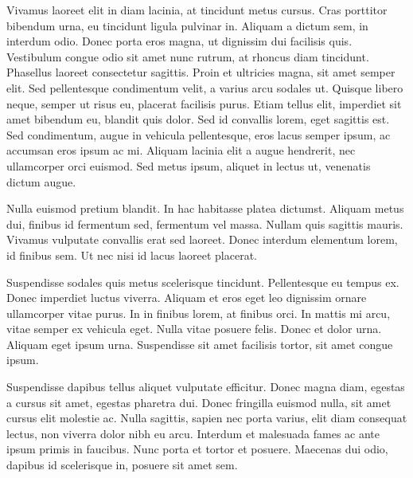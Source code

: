 \documentclass[referee]{jfm}
\begin{document}
Vivamus laoreet elit in diam lacinia, at tincidunt metus cursus. Cras porttitor bibendum urna, eu tincidunt ligula pulvinar in. Aliquam a dictum sem, in interdum odio. Donec porta eros magna, ut dignissim dui facilisis quis. Vestibulum congue odio sit amet nunc rutrum, at rhoncus diam tincidunt. Phasellus laoreet consectetur sagittis. Proin et ultricies magna, sit amet semper elit. Sed pellentesque condimentum velit, a varius arcu sodales ut. Quisque libero neque, semper ut risus eu, placerat facilisis purus. Etiam tellus elit, imperdiet sit amet bibendum eu, blandit quis dolor. Sed id convallis lorem, eget sagittis est. Sed condimentum, augue in vehicula pellentesque, eros lacus semper ipsum, ac accumsan eros ipsum ac mi. Aliquam lacinia elit a augue hendrerit, nec ullamcorper orci euismod. Sed metus ipsum, aliquet in lectus ut, venenatis dictum augue.

Nulla euismod pretium blandit. In hac habitasse platea dictumst. Aliquam metus dui, finibus id fermentum sed, fermentum vel massa. Nullam quis sagittis mauris. Vivamus vulputate convallis erat sed laoreet. Donec interdum elementum lorem, id finibus sem. Ut nec nisi id lacus laoreet placerat.

Suspendisse sodales quis metus scelerisque tincidunt. Pellentesque eu tempus ex. Donec imperdiet luctus viverra. Aliquam et eros eget leo dignissim ornare ullamcorper vitae purus. In in finibus lorem, at finibus orci. In mattis mi arcu, vitae semper ex vehicula eget. Nulla vitae posuere felis. Donec et dolor urna. Aliquam eget ipsum urna. Suspendisse sit amet facilisis tortor, sit amet congue ipsum.

Suspendisse dapibus tellus aliquet vulputate efficitur. Donec magna diam, egestas a cursus sit amet, egestas pharetra dui. Donec fringilla euismod nulla, sit amet cursus elit molestie ac. Nulla sagittis, sapien nec porta varius, elit diam consequat lectus, non viverra dolor nibh eu arcu. Interdum et malesuada fames ac ante ipsum primis in faucibus. Nunc porta et tortor et posuere. Maecenas dui odio, dapibus id scelerisque in, posuere sit amet sem.



\end{document}
